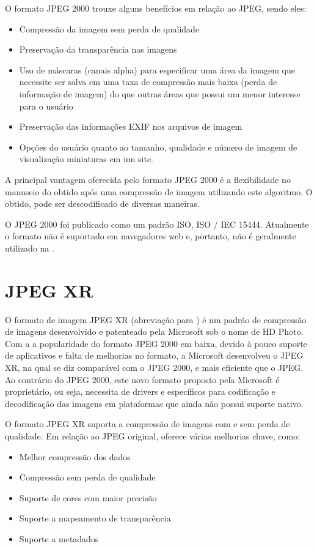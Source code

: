 \documentclass[espaco=simples,appendix=Name]{abnt}
\begin{document}
O formato JPEG 2000 trouxe alguns benefícios em relação ao JPEG, sendo eles:
\begin{itemize}
	\item Compressão da imagem sem perda de qualidade
	\item Preservação da transparência nas imagens
	\item Uso de máscaras (canais alpha) para especificar uma área da imagem que necessite ser salva em uma taxa de compressão mais baixa (perda de informação de imagem) do que outras áreas que possui um menor interesse para o usuário
	\item Preservação das informações EXIF nos arquivos de imagem
	\item Opções do usuário quanto ao tamanho, qualidade e número de imagem de visualização miniaturas em um site.
\end{itemize}

A principal vantagem oferecida pelo formato JPEG 2000 é a flexibilidade no manuseio do obtido após uma compressão de imagem utilizando este algoritmo. O  obtido, pode ser descodificado de diversas maneiras.

O JPEG 2000 foi publicado como um padrão ISO, ISO / IEC 15444. Atualmente o formato não é suportado em navegadores web e, portanto, não é geralmente utilizado na .\cite{JPEG}

\section{JPEG XR}

O formato de imagem JPEG XR (abreviação para ) é um padrão de compressão de imagens desenvolvido e patenteado pela Microsoft sob o nome de HD Photo.
Com a a popularidade do formato JPEG 2000 em baixa, devido à pouco suporte de aplicativos e falta de melhorias no formato, a Microsoft desenvolveu o JPEG XR, na qual se diz comparável com o JPEG 2000, e mais eficiente que o JPEG. Ao contrário do JPEG 2000, este novo formato proposto pela Microsoft é proprietário, ou seja, necessita de drivers e  específicos para codificação e decodificação das imagens em plataformas que ainda não possui suporte nativo.

O formato JPEG XR suporta a compressão de imagens com e sem perda de qualidade. Em relação ao JPEG original, oferece várias melhorias chave, como:
\begin{itemize}
\item Melhor compressão dos dados
\item Compressão sem perda de qualidade
\item Suporte de cores com maior precisão
\item Suporte a  mapeamento de transparência
\item Suporte a metadados
\end{itemize}
\end{document}
